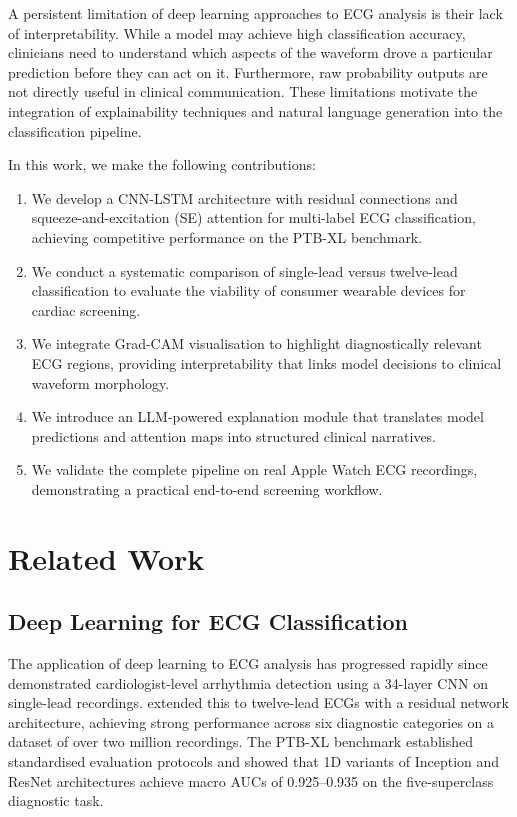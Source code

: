 \documentclass[10pt]{article}
\begin{document}
A persistent limitation of deep learning approaches to ECG analysis is their lack of interpretability. While a model may achieve high classification accuracy, clinicians need to understand which aspects of the waveform drove a particular prediction before they can act on it. Furthermore, raw probability outputs are not directly useful in clinical communication. These limitations motivate the integration of explainability techniques and natural language generation into the classification pipeline.

In this work, we make the following contributions:
\begin{enumerate}
    \item We develop a CNN-LSTM architecture with residual connections and squeeze-and-excitation (SE) attention for multi-label ECG classification, achieving competitive performance on the PTB-XL benchmark.
    \item We conduct a systematic comparison of single-lead versus twelve-lead classification to evaluate the viability of consumer wearable devices for cardiac screening.
    \item We integrate Grad-CAM visualisation to highlight diagnostically relevant ECG regions, providing interpretability that links model decisions to clinical waveform morphology.
    \item We introduce an LLM-powered explanation module that translates model predictions and attention maps into structured clinical narratives.
    \item We validate the complete pipeline on real Apple Watch ECG recordings, demonstrating a practical end-to-end screening workflow.
\end{enumerate}

\section{Related Work}

\subsection{Deep Learning for ECG Classification}

The application of deep learning to ECG analysis has progressed rapidly since \citet{hannun2019cardiologist} demonstrated cardiologist-level arrhythmia detection using a 34-layer CNN on single-lead recordings. \citet{ribeiro2020ecg} extended this to twelve-lead ECGs with a residual network architecture, achieving strong performance across six diagnostic categories on a dataset of over two million recordings. The PTB-XL benchmark \citep{wagner2020ptbxl, strodthoff2021benchmarking} established standardised evaluation protocols and showed that 1D variants of Inception and ResNet architectures achieve macro AUCs of 0.925--0.935 on the five-superclass diagnostic task.
\end{document}
